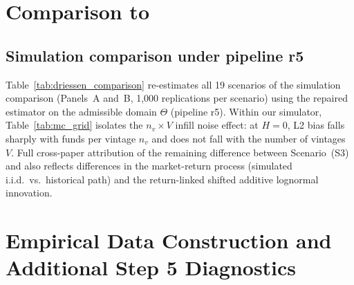 








\section{Comparison to \citet{DLP12}}
\label{sec:dlp_results_comparison}

\subsection{Simulation comparison under pipeline r5}
\label{sec:dlp_simulation}

Table~\ref{tab:driessen_comparison} re-estimates all 19 scenarios of the \citet[Table~1]{DLP12} simulation comparison (Panels~A and~B, 1,000 replications per scenario) using the repaired estimator on the admissible domain $\Theta$ (pipeline r5). Within our simulator, Table~\ref{tab:mc_grid} isolates the $n_v \times V$ infill noise effect: at $H=0$, L2 bias falls sharply with funds per vintage $n_v$ and does not fall with the number of vintages $V$. Full cross-paper attribution of the remaining difference between Scenario~(S3) and \citet[Table~1]{DLP12} also reflects differences in the market-return process (simulated i.i.d.\ vs.\ historical path) and the return-linked shifted additive lognormal innovation.



\section{Empirical Data Construction and Additional Step 5 Diagnostics}
\label{sec:appendix_empirical_extra}

